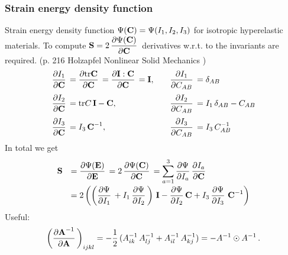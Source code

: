 \subsubsection{Strain energy density function}
Strain energy density function $\Psi(\textbf{C}) = \Psi(I_1, I_2, I_3)$ for isotropic hyperelastic materials. To compute $\bfS = 2\,\p{\Psi(\bfC)}{\bfC}$ derivatives w.r.t. to the invariants are required. (p. 216 Holzapfel Nonlinear Solid Mechanics  \cite{holzapfel2000nonlinear})
\begin{equation*}
  \begin{array}{lll}
    \p{I_1}{\bfC} = \p{\tr\bfC}{\bfC} = \p{\bfI:\bfC}{\bfC} = \bfI, \quad &\p{I_1}{C_{AB}} = \delta_{AB}\\[4mm]
    \p{I_2}{\bfC} = \tr C\,\bfI - \bfC, \quad &\p{I_2}{C_{AB}} = I_1\,\delta_{AB} - C_{AB}\\[4mm]
    \p{I_3}{\bfC} = I_3\,\bfC^{-1}, \quad &\p{I_3}{C_{AB}} = I_3\,C^{-1}_{AB}
  \end{array}
\end{equation*}
In total we get
\begin{equation*}
  \begin{array}{lll}
    \bfS &=  \p{\Psi(\bfE)}{\bfE} = 2\,\p{\Psi(\bfC)}{\bfC} = \ds\s{a=1}{3}\p{\Psi}{I_a}\p{I_a}{\bfC}\\[4mm]
     &= 2\left(\left(\p{\Psi}{I_1} + I_1\,\p{\Psi}{I_2}\right)\,\bfI - \p{\Psi}{I_2}\bfC + I_3\,\p{\Psi}{I_3} \,\bfC^{-1}\right)
  \end{array}
\end{equation*}
Useful:
\begin{equation*}
  \begin{array}{lll}
    \left( \p{\bfA^{-1}}{\bfA} \right)_{ijkl} = -\dfrac12(A^{-1}_{ik}\,A^{-1}_{lj} + A^{-1}_{il}\,A^{-1}_{kj}) = -A^{-1}\odot A^{-1}\,.
  \end{array}
\end{equation*}
